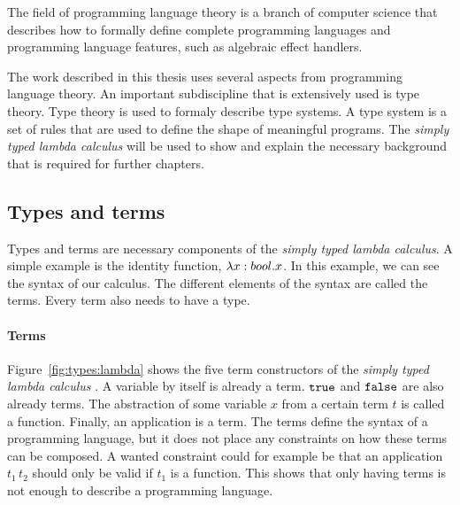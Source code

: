 The field of programming language theory is a branch of computer science that describes how to formally define complete programming languages and programming language features, such as algebraic effect handlers.

The work described in this thesis uses several aspects from programming language theory. An important subdiscipline that is extensively used is type theory. Type theory is used to formaly describe type systems. A type system is a set of rules that are used to define the shape of meaningful programs. The \textit{simply typed lambda calculus} will be used to show and explain the necessary background that is required for further chapters. \cite[Chapter~9]{pierce2002types}

\subsection{Types and terms}\label{simpletypes}
Types and terms are necessary components of the \textit{simply typed lambda calculus}. A simple example is the identity function, $\lambda x \mathrel{:} bool . x$. In this example, we can see the syntax of our calculus. The different elements of the syntax are called the terms. Every term also needs to have a type. 

\paragraph{Terms}
Figure~\ref{fig:types:lambda} shows the five term constructors of the \textit{simply typed lambda calculus} \cite{mitchell1996foundations}. A variable by itself is already a term. $\mathtt{true}$ and $\mathtt{false}$ are also already terms. The abstraction of some variable $x$ from a certain term $t$ is called a function. Finally, an application is a term. The terms define the syntax of a programming language, but it does not place any constraints on how these terms can be composed. A wanted constraint could for example be that an application $t_1 \, t_2$ should only be valid if $t_1$ is a function. This shows that only having terms is not enough to describe a programming language. \cite{hindley1986introduction}

